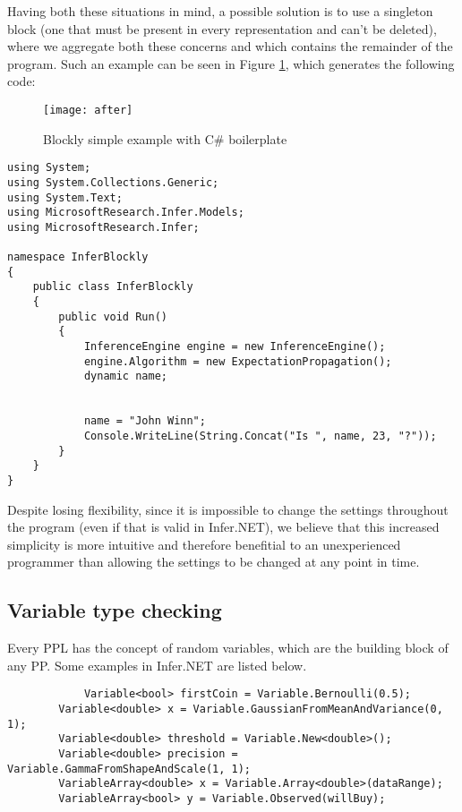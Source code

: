 Having both these situations in mind, a possible solution is to use a singleton
block (one that must be present in every representation and can't be deleted),
where we aggregate both these concerns and which contains the remainder of the program.
Such an example can be seen in Figure \ref{fig:after}, which generates the following code:

\begin{figure}[t]
  \begin{center}
    \leavevmode
    \texttt{[image: after]}
    \caption{Blockly simple example with C# boilerplate}
    \label{fig:after}
  \end{center}
\end{figure}

\begin{lstlisting}
using System;
using System.Collections.Generic;
using System.Text;
using MicrosoftResearch.Infer.Models;
using MicrosoftResearch.Infer;

namespace InferBlockly
{
	public class InferBlockly
	{
		public void Run()
		{
			InferenceEngine engine = new InferenceEngine();
			engine.Algorithm = new ExpectationPropagation();
			dynamic name;


			name = "John Winn";
			Console.WriteLine(String.Concat("Is ", name, 23, "?"));
		}
	}
}
\end{lstlisting}

Despite losing flexibility, since it is impossible to change the settings
throughout the program (even if that is valid in Infer.NET),
we believe that this increased simplicity is more intuitive and therefore benefitial to an unexperienced
programmer than allowing the settings to be changed at any point in time.

\subsection{Variable type checking}

Every PPL has the concept of random variables, which are the building block of
any PP. Some examples in Infer.NET are listed below.

\begin{lstlisting}
  			Variable<bool> firstCoin = Variable.Bernoulli(0.5);
        Variable<double> x = Variable.GaussianFromMeanAndVariance(0, 1);
        Variable<double> threshold = Variable.New<double>();
        Variable<double> precision = Variable.GammaFromShapeAndScale(1, 1);
        VariableArray<double> x = Variable.Array<double>(dataRange);
        VariableArray<bool> y = Variable.Observed(willBuy);
\end{lstlisting}

